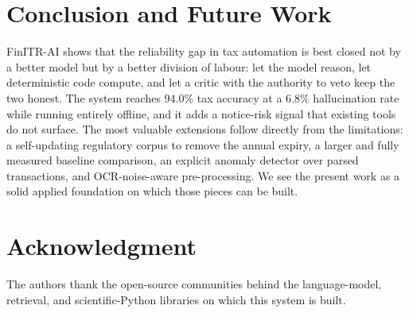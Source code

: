 \documentclass[conference]{IEEEtran}
\begin{document}
\section{Conclusion and Future Work}
FinITR-AI shows that the reliability gap in tax automation is best closed not by a
better model but by a better division of labour: let the model reason, let
deterministic code compute, and let a critic with the authority to veto keep the
two honest. The system reaches 94.0\% tax accuracy at a 6.8\% hallucination rate
while running entirely offline, and it adds a notice-risk signal that existing
tools do not surface. The most valuable extensions follow directly from the
limitations: a self-updating regulatory corpus to remove the annual expiry, a
larger and fully measured baseline comparison, an explicit anomaly detector over
parsed transactions, and OCR-noise-aware pre-processing. We see the present work
as a solid applied foundation on which those pieces can be built.

\section*{Acknowledgment}
The authors thank the open-source communities behind the language-model,
retrieval, and scientific-Python libraries on which this system is built.
\end{document}
